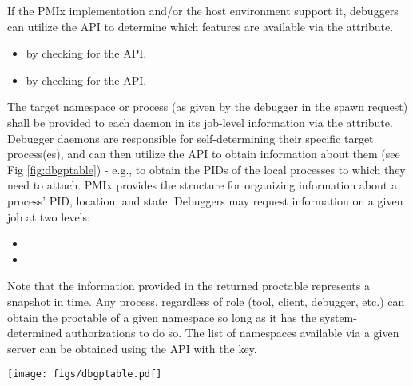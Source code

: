If the \ac{PMIx} implementation and/or the host environment support it, debuggers can utilize the  \ac{API} to determine which features are available via the  attribute.

\begin{itemize}
    \item {} by checking  for the  \ac{API}.
    \item {} by checking  for the  \ac{API}.
\end{itemize}

The target namespace or process (as given by the debugger in the spawn request) shall be provided to each daemon in its job-level information via the  attribute. Debugger daemons are responsible for self-determining their specific target process(es), and can then utilize the  \ac{API} to obtain information about them (see Fig \ref{fig:dbgptable}) - e.g., to obtain the \acp{PID} of the local processes to which they need to attach. \ac{PMIx} provides the  structure for organizing information about a process' \ac{PID}, location, and state. Debuggers may request information on a given job at two levels:

\begin{itemize}
    \item {}
    \item {}
\end{itemize}

Note that the information provided in the returned proctable represents a snapshot in time. Any process, regardless of role (tool, client, debugger, etc.) can obtain the proctable of a given namespace so long as it has the system-determined authorizations to do so. The list of namespaces available via a given server can be obtained using the  \ac{API} with the  key.

\begingroup
\begin{figure*}[ht!]
  \begin{center}
    \texttt{[image: figs/dbgptable.pdf]}
  \end{center}
  \caption{Obtaining proctables}
  \label{fig:dbgptable}
\end{figure*}
\endgroup

